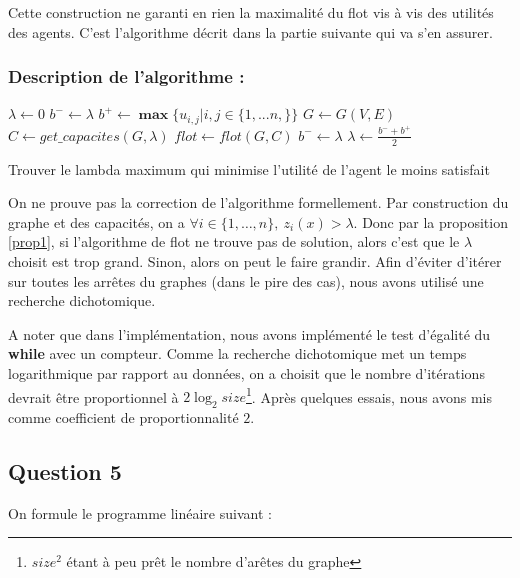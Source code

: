 \documentclass[a4paper, titlepage, oneside, 12pt]{article}%
\newcommand\boldmin{\mathop{\mathbf{min}}}
\newcommand\boldmax{\mathop{\mathbf{max}}}
\begin{document}
Cette construction ne garanti en rien la maximalité du flot vis à vis des utilités des agents. C'est l'algorithme décrit dans la partie suivante qui va s'en assurer.

\subsubsection{Description de l'algorithme : }
\begin{algorithm}
\DontPrintSemicolon %
\KwOut{$z^*=\boldmax \boldmin z_i(x)$}
$\lambda \gets 0$\;
$b^- \gets \lambda$\;
$b^+ \gets \boldmax \{u_{i,j} | i,j \in \{1,...n,\}\}$\;
$G \gets G(V,E)$\;
 {
  $C\gets get\_capacites(G,\lambda)$\;
  $flot \gets flot(G,C)$\;
   {
    $b^- \gets \lambda $\;
  }
  $\lambda \gets \frac{b^- + b^+}{2}$\;
}

\Return{$\lambda$}\;
\caption{Trouver le lambda maximum qui minimise l'utilité de l'agent le moins satisfait}
\label{algo:max}
\end{algorithm}
    

On ne prouve pas la correction de l'algorithme formellement. Par construction du graphe et des capacités, on a $\forall i \in \{1,\dots, n\},\ z_i(x)>\lambda$. Donc par la proposition \ref{prop1}, si l'algorithme de flot ne trouve pas de solution, alors c'est que le $\lambda$ choisit est trop grand. Sinon, alors on peut le faire grandir. Afin d'éviter d'itérer sur toutes les arrêtes du graphes (dans le pire des cas), nous avons utilisé une recherche dichotomique.

A noter que dans l'implémentation, nous avons implémenté le test d'égalité du \textbf{while} avec un compteur. Comme la recherche dichotomique met un temps logarithmique par rapport au données, on a choisit que le nombre d'itérations devrait être proportionnel à $2\log_2 size$\footnote{$size^2$ étant à peu prêt le nombre d'arêtes du graphe}. Après quelques essais, nous avons mis comme coefficient de proportionnalité $2$.

\subsection{Question 5}
On formule le programme linéaire suivant :
\end{document}
